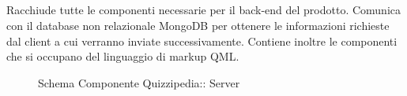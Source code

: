 \subsection{}
Racchiude tutte le componenti necessarie per il back-end del prodotto. Comunica con il database non relazionale MongoDB per ottenere le informazioni richieste dal client a cui verranno inviate successivamente.
Contiene inoltre le componenti che si occupano del linguaggio di markup QML.
\begin{figure}[H]
\centering
\noindent{}
\caption[Schema Componente Server]{Schema Componente Quizzipedia:: Server}
\end{figure}
